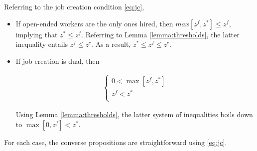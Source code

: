Referring to the job creation condition \eqref{eq:jc},
\begin{itemize}
\item If open-ended workers are the only ones hired, then $max \left[ z^f, z^* \right] \leq z^f$, implying that $z^* \leq z^f$. Referring to Lemma \ref{lemma:thresholds}, the latter inequality entails $z^f \leq z^c$. As a result, $z^* \leq z^f \leq z^c$.

\item If job creation is dual, then

\begin{align*}
\left\{
\begin{array}{l}
0 < \max \left[ z^f, z^* \right]\\
z^f < z^*\\
\end{array}
\right.
\end{align*}

Using Lemma \ref{lemma:thresholds}, the latter system of inequalities boils down to $\max\left[ 0 , z^f \right] < z^*$.
\end{itemize}

For each case, the converse propositions are straightforward using \eqref{eq:jc}. \qedsymbol



